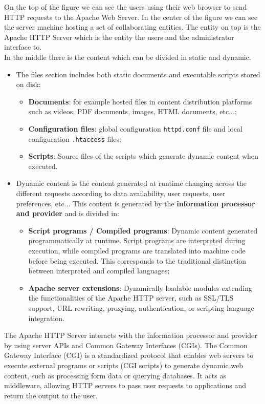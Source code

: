 \documentclass{scrbook}
\begin{document}
	On the top of the figure we can see the users using their web browser to send HTTP requests to the Apache Web Server. In the center of the figure we can see the server machine hosting a set of collaborating entities. The entity on top is the Apache HTTP Server which is the entity the users and the administrator interface to.\\
	In the middle there is the content which can be divided in static and dynamic.
	\begin{itemize}
		\item The files section includes both static documents and executable scripts stored on disk:
		\begin{itemize}
			\item \textbf{Documents}: for example hosted files in content distribution platforms such as videos, PDF documents, images, HTML documents, etc...;
			\item \textbf{Configuration files}: global configuration \texttt{httpd.conf} file and local configuration \texttt{.htaccess} files; 
			\item \textbf{Scripts}: Source files of the scripts which generate dynamic content when executed.
		\end{itemize}
		
		\item Dynamic content is the content generated at runtime changing across the different requests according to data availability, user requests, user preferences, etc... This content is generated by the \textbf{information processor and provider} and is divided in:
		\begin{itemize}
			\item \textbf{Script programs / Compiled programs}: Dynamic content generated programmatically at runtime. Script programs are interpreted during execution, while compiled programs are translated into machine code before being executed. This corresponds to the traditional distinction between interpreted and compiled languages;
			
			\item \textbf{Apache server extensions}: Dynamically loadable modules extending the functionalities of the Apache HTTP server, such as SSL/TLS support, URL rewriting, proxying, authentication, or scripting language integration.
		\end{itemize}
	\end{itemize}
	
	The Apache HTTP Server interacts with the information processor and provider by using server APIs and Common Gateway Interfaces (CGIs). The Common Gateway Interface (CGI) is a standardized protocol that enables web servers to execute external programs or scripts (CGI scripts) to generate dynamic web content, such as processing form data or querying databases. It acts as middleware, allowing HTTP servers to pass user requests to applications and return the output to the user.\\
	
\end{document}
